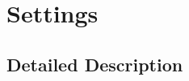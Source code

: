 \hypertarget{group__settings}{}\section{Settings}
\label{group__settings}


\subsection{Detailed Description}
